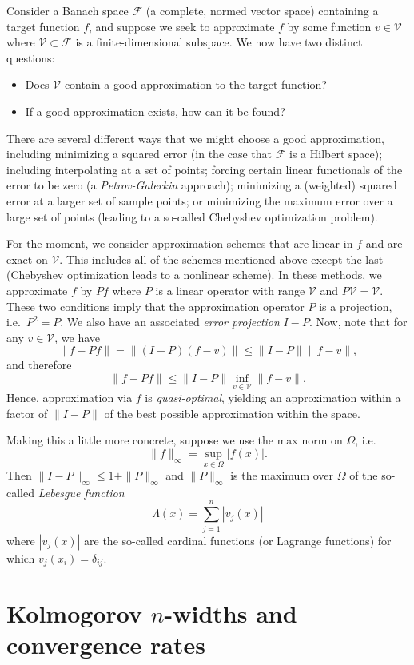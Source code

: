 \documentclass[12pt, leqno]{article} %
\begin{document}
Consider a Banach space $\mathcal{F}$ (a complete, normed vector
space) containing a target function $f$, and suppose we seek to
approximate $f$ by some function $v \in \mathcal{V}$ where
$\mathcal{V} \subset \mathcal{F}$ is a finite-dimensional subspace.
We now have two distinct questions:
\begin{itemize}
\item Does $\mathcal{V}$ contain a good approximation to the target
  function?
\item If a good approximation exists, how can it be found?
\end{itemize}
There are several different ways that we might choose a good
approximation, including minimizing a squared error (in the case that
$\mathcal{F}$ is a Hilbert space); including interpolating at a set of
points; forcing certain linear functionals of the error to be zero (a
{\em Petrov-Galerkin} approach); minimizing a (weighted) squared error
at a larger set of sample points; or minimizing the maximum error over
a large set of points (leading to a so-called Chebyshev optimization
problem).

For the moment, we consider approximation schemes that are linear in
$f$ and are exact on $\mathcal{V}$.  This includes all of the schemes
mentioned above except the last (Chebyshev optimization leads to a
nonlinear scheme).  In these methods, we approximate $f$ by
$Pf$ where $P$ is a linear operator with range $\mathcal{V}$ and $P
\mathcal{V} = \mathcal{V}$.  These two conditions imply that the
approximation operator $P$ is a projection, i.e.~$P^2 = P$.  We also
have an associated {\em error projection} $I-P$.
Now, note that for any $v \in \mathcal{V}$, we have
\[
  \|f-Pf\| = \|(I-P)(f-v)\| \leq \|I-P\| \|f-v\|,
\]
and therefore
\[
  \|f-Pf\| \leq \|I-P\| \inf_{v \in \mathcal{V}} \|f-v\|.
\]
Hence, approximation via $f$ is {\em quasi-optimal}, yielding an
approximation within a factor of $\|I-P\|$ of the best possible
approximation within the space.

Making this a little more concrete, suppose we use the max norm on
$\Omega$, i.e.
\[
  \|f\|_{\infty} = \sup_{x \in \Omega} |f(x)|.
\]
Then $\|I-P\|_\infty \leq 1 + \|P\|_\infty$ and $\|P\|_\infty$ is the
maximum over $\Omega$ of the so-called {\em Lebesgue function}
\[
  \Lambda(x) = \sum_{j=1}^n |v_j(x)|
\]
where $|v_j(x)|$ are the so-called cardinal functions (or Lagrange
functions) for which $v_j(x_i) = \delta_{ij}$.

\section{Kolmogorov $n$-widths and convergence rates}
\end{document}
